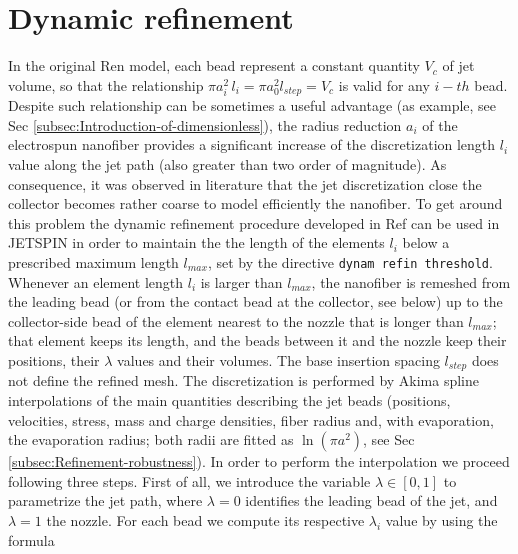 
\section{Dynamic refinement\label{sec:Dynamic-refinement}}

In the original Ren model, each bead represent a constant quantity
$V_{c}$ of jet volume, so that the relationship $\pi a_{i}^{2}\,l_{i}=\pi a_{0}^{2}l_{step}=V_{c}$
is valid for any $i-th$ bead. Despite such relationship can be sometimes
a useful advantage (as example, see Sec \ref{subsec:Introduction-of-dimensionless}),
the radius reduction $a_{i}$ of the electrospun nanofiber provides
a significant increase of the discretization length $l_{i}$ value
along the jet path (also greater than two order of magnitude). As
consequence, it was observed in literature \cite{kowalewski2009modeling}
that the jet discretization close the collector becomes rather coarse
to model efficiently the nanofiber. To get around this problem the
dynamic refinement procedure developed in Ref \cite{lauricella2016refinement}
can be used in JETSPIN in order to maintain the the length of the
elements $l_{i}$ below a prescribed maximum length $l_{max}$, set by
the directive \texttt{dynam refin threshold}.
Whenever an element length $l_{i}$ is larger than $l_{max}$, the
nanofiber is remeshed from the leading bead (or from the contact bead
at the collector, see below) up to the collector-side bead of the element
nearest to the nozzle that is longer than $l_{max}$; that element keeps
its length, and the beads between it and the nozzle keep their positions,
their $\lambda$ values and their volumes. The base
insertion spacing $l_{step}$ does not define the refined mesh. The
discretization is performed by Akima
spline interpolations \cite{akima1970new,akima1991method} of the
main quantities describing the jet beads (positions, velocities, stress,
mass and charge densities, fiber radius and, with evaporation, the
evaporation radius; both radii are fitted as $\ln\left(\pi a^{2}\right)$,
see Sec \ref{subsec:Refinement-robustness}). In order to perform the interpolation we proceed
following three steps. First of all, we introduce the variable $\lambda\in[0,1]$
to parametrize the jet path, where $\lambda=0$ identifies the leading
bead of the jet, and $\lambda=1$ the nozzle. For each bead we compute
its respective $\lambda_{i}$ value by using the formula

